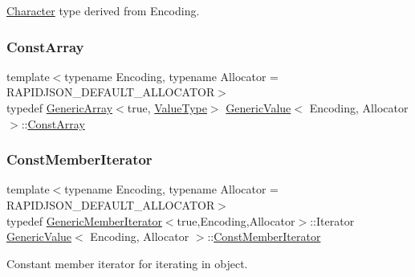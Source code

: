 \hyperlink{structCharacter}{Character} type derived from Encoding. 

\mbox{\label{classGenericValue_a8f1d2728de56600b5f3df596e2a8a181}} 
\subsubsection{\texorpdfstring{Const\+Array}{ConstArray}}
{\footnotesize\ttfamily template$<$typename Encoding, typename Allocator = R\+A\+P\+I\+D\+J\+S\+O\+N\+\_\+\+D\+E\+F\+A\+U\+L\+T\+\_\+\+A\+L\+L\+O\+C\+A\+T\+OR$>$ \\
typedef \hyperlink{classGenericArray}{Generic\+Array}$<$true, \hyperlink{classGenericValue_a43a39bb4fca9b9d3de3da6ac353d25ce}{Value\+Type}$>$ \hyperlink{classGenericValue}{Generic\+Value}$<$ Encoding, Allocator $>$\+::\hyperlink{classGenericValue_a8f1d2728de56600b5f3df596e2a8a181}{Const\+Array}}

\mbox{\label{classGenericValue_aac08c3e660a9036d3dcb8b10ff6c61f4}} 
\subsubsection{\texorpdfstring{Const\+Member\+Iterator}{ConstMemberIterator}}
{\footnotesize\ttfamily template$<$typename Encoding, typename Allocator = R\+A\+P\+I\+D\+J\+S\+O\+N\+\_\+\+D\+E\+F\+A\+U\+L\+T\+\_\+\+A\+L\+L\+O\+C\+A\+T\+OR$>$ \\
typedef \hyperlink{classGenericMemberIterator}{Generic\+Member\+Iterator}$<$true,Encoding,Allocator$>$\+::Iterator \hyperlink{classGenericValue}{Generic\+Value}$<$ Encoding, Allocator $>$\+::\hyperlink{classGenericValue_aac08c3e660a9036d3dcb8b10ff6c61f4}{Const\+Member\+Iterator}}



Constant member iterator for iterating in object. 

\mbox{\label{classGenericValue_a55ad310f5434e0e4a93df616b326ba7e}} 
